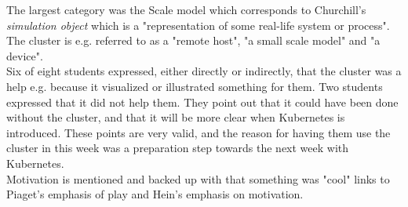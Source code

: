 \noindent The largest category was the Scale model which corresponds to Churchill's \textit{simulation object} which is a "representation of some real-life system or process". The cluster is e.g. referred to as a "remote host", "a small scale model" and "a device". \\
Six of eight students expressed, either directly or indirectly, that the cluster was a help e.g. because it visualized or illustrated something for them. Two students expressed that it did not help them. They point out that it could have been done without the cluster, and that it will be more clear when Kubernetes is introduced. These points are very valid, and the reason for having them use the cluster in this week was a preparation step towards the next week with Kubernetes. \\
Motivation is mentioned and backed up with that something was "cool" links to Piaget's emphasis of play and Hein's emphasis on motivation.

